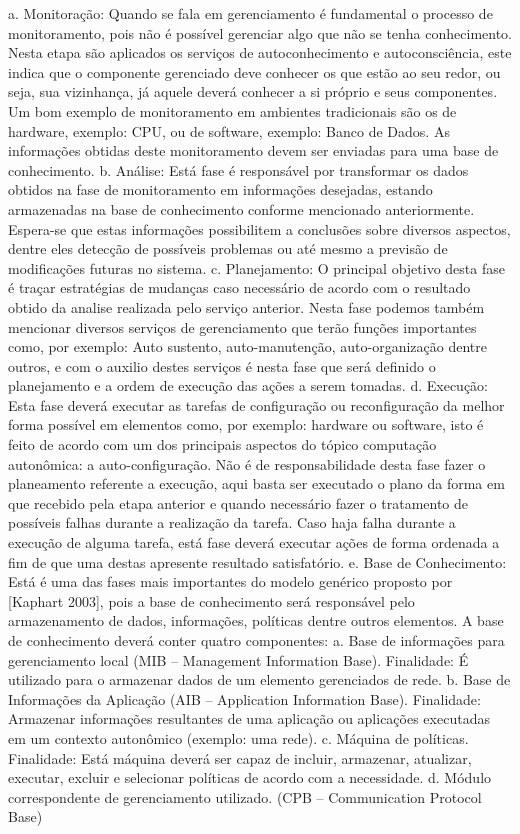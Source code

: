 \documentclass[11pt,twoside]{article}
\begin{document}
a.	Monitoração: 
Quando se fala em gerenciamento é fundamental o processo de monitoramento, pois não é possível gerenciar algo que não se tenha conhecimento. Nesta etapa são aplicados os serviços de autoconhecimento e autoconsciência, este indica que o componente gerenciado deve conhecer os que estão ao seu redor, ou seja, sua vizinhança, já aquele deverá conhecer a si próprio e seus componentes. Um bom exemplo de monitoramento em ambientes tradicionais são os de hardware, exemplo: CPU, ou de software, exemplo: Banco de Dados. As informações obtidas deste monitoramento devem ser enviadas para uma base de conhecimento.
b.	Análise:
Está fase é responsável por transformar os dados obtidos na fase de monitoramento em informações desejadas, estando armazenadas na base de conhecimento conforme mencionado anteriormente. Espera-se que estas informações possibilitem a conclusões sobre diversos aspectos, dentre eles detecção de possíveis problemas ou até mesmo a previsão de modificações futuras no sistema.
c.	Planejamento: 
O principal objetivo desta fase é traçar estratégias de mudanças caso necessário de acordo com o resultado obtido da analise realizada pelo serviço anterior. Nesta fase podemos também mencionar diversos serviços de gerenciamento que terão funções importantes como, por exemplo: Auto sustento, auto-manutenção, auto-organização dentre outros, e com o auxilio destes serviços é nesta fase que será definido o planejamento e a ordem de execução das ações a serem tomadas.
d.	Execução:
Esta fase deverá executar as tarefas de configuração ou reconfiguração da melhor forma possível em elementos como, por exemplo: hardware ou software, isto é feito de acordo com um dos principais aspectos do tópico computação autonômica: a auto-configuração. Não é de responsabilidade desta fase fazer o planeamento referente a execução, aqui basta ser executado o plano da forma em que recebido pela etapa anterior e quando necessário fazer o tratamento de possíveis falhas durante a realização da tarefa. Caso haja falha durante a execução de alguma tarefa, está fase deverá executar ações de forma ordenada a fim de que uma destas apresente resultado satisfatório.
e.	Base de Conhecimento:
Está é uma das fases mais importantes do modelo genérico proposto por [Kaphart 2003], pois a base de conhecimento será responsável pelo armazenamento de dados, informações, políticas dentre outros elementos.
A base de conhecimento deverá conter quatro componentes: 
a.	Base de informações para gerenciamento local (MIB – Management Information Base).
Finalidade: É utilizado para o armazenar dados de um elemento gerenciados de rede.
b.	Base de Informações da Aplicação (AIB – Application Information Base).
Finalidade: Armazenar informações resultantes de uma aplicação ou aplicações executadas em um contexto autonômico (exemplo: uma rede).
c.	Máquina de políticas. 
Finalidade: Está máquina deverá ser capaz de incluir, armazenar, atualizar, executar, excluir e selecionar políticas de acordo com a necessidade.
d.	Módulo correspondente de gerenciamento utilizado. (CPB – Communication Protocol Base)
\end{document}
